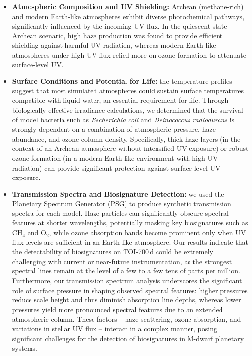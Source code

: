 \begin{itemize}

\item \textbf{Atmospheric Composition and UV Shielding:} Archean (methane-rich) and modern Earth-like atmospheres exhibit diverse photochemical pathways, significantly influenced by the incoming UV flux. In the quiescent-state Archean scenario, high haze production was found to provide efficient shielding against harmful UV radiation, whereas modern Earth-like atmospheres under high UV flux relied more on ozone formation to attenuate surface-level UV.
\item \textbf{Surface Conditions and Potential for Life:} the temperature profiles suggest that most simulated atmospheres could sustain surface temperatures compatible with liquid water, an essential requirement for life. Through biologically effective irradiance calculations, we determined that the survival of model bacteria such as \textit{Escherichia coli} and \textit{Deinococcus radiodurans} is strongly dependent on a combination of atmospheric pressure, haze abundance, and ozone column density. Specifically, thick haze layers (in the context of an Archean atmosphere without intensified UV exposure) or robust ozone formation (in a modern Earth-like environment with high UV radiation) can provide significant protection against surface-level UV exposure.
\item \textbf{Transmission Spectra and Biosignature Detection:} we used the Planetary Spectrum Generator (PSG) to produce synthetic transmission spectra for each model. Haze particles can significantly obscure spectral features at shorter wavelengths, potentially masking key biosignatures such as CH$_4$ and O$_2$, while ozone absorption bands become prominent only when UV flux levels are sufficient in an Earth-like atmosphere. Our results indicate that the detectability of biosignatures on TOI-700\,d could be extremely challenging with current or near-future instrumentation, as the strongest spectral lines remain at the level of a few to a few tens of parts per million. 
Furthermore, our transmission spectrum analysis underscores the significant role of surface pressure in shaping observed spectral features: higher pressures reduce scale height and thus diminish absorption line depths, whereas lower pressures yield more pronounced spectral features due to an extended atmospheric column. These factors -- haze scattering, ozone absorption, and variations in stellar UV flux -- interact in a complex manner, posing significant challenges for the detection of biosignatures in M-dwarf planetary systems.

\end{itemize}
